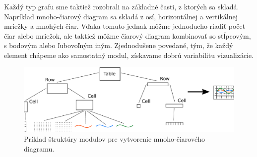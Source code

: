 Každý typ grafu sme taktiež rozobrali na základné časti, z ktorých sa skladá. Napríklad mnoho-čiarový diagram sa skladá z osí, horizontálnej a vertikálnej mriežky a mnohých čiar. Vďaka tomuto jednak môžme jednoducho riadiť počet čiar alebo mriežok, ale taktiež môžme čiarový diagram kombinovať so stĺpcovým, s bodovým alebo ľubovoľným iným. Zjednodušene povedané, tým, že každý element chápeme ako samostatný modul, získavame dobrú variabilitu vizualizácie.

\begin{figure}
	\centering
	\hspace*{-0.2in}
	\includegraphics[width = 6in]{tree}
	\caption{Príklad štruktúry modulov pre vytvorenie mnoho-čiarového diagramu.}
	\label{fig:tree} 
\end{figure}